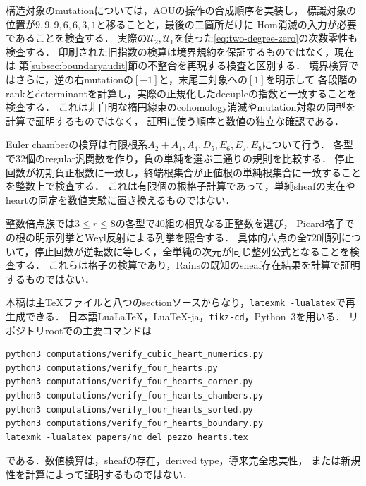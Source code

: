 構造対象のmutationについては，AOUの操作の合成順序を実装し，
標識対象の位置が$9,9,9,6,6,3,1$と移ることと，最後の二箇所だけに
Hom消滅の入力が必要であることを検査する．
実際の$\mathcal U_2,\mathcal U_1$を使った\eqref{eq:two-degree-zero}の次数零性も検査する．
印刷された旧指数の検算は境界規約を保証するものではなく，現在は
第\ref{subsec:boundaryaudit}節の不整合を再現する検査と区別する．
境界検算ではさらに，逆の右mutationの$[-1]$と，末尾三対象への$[1]$を明示して
各段階のrankとdeterminantを計算し，実際の正規化したdecupleの指数と一致することを検査する．
これは非自明な楕円線束のcohomology消滅やmutation対象の同型を計算で証明するものではなく，
証明に使う順序と数値の独立な確認である．

Euler chamberの検算は有限根系$A_2+A_1,A_4,D_5,E_6,E_7,E_8$について行う．
各型で32個のregular汎関数を作り，負の単純を選ぶ三通りの規則を比較する．
停止回数が初期負正根数に一致し，終端根集合が正値根の単純根集合に一致することを整数上で検査する．
これは有限個の根格子計算であって，単純sheafの実在やheartの同定を数値実験に置き換えるものではない．

整数倍点族では$3\le r\le8$の各型で40組の相異なる正整数を選び，
Picard格子での根の明示列挙とWeyl反射による列挙を照合する．
具体的六点の全720順列について，停止回数が逆転数に等しく，全単純の次元が同じ整列公式となることを検査する．
これらは格子の検算であり，Rainsの既知のsheaf存在結果を計算で証明するものではない．

本稿は主TeXファイルと八つのsectionソースからなり，\texttt{latexmk -lualatex}で再生成できる．
日本語LuaLaTeX，LuaTeX-ja，\texttt{tikz-cd}，Python~3を用いる．
リポジトリrootでの主要コマンドは
\begin{verbatim}
python3 computations/verify_cubic_heart_numerics.py
python3 computations/verify_four_hearts.py
python3 computations/verify_four_hearts_corner.py
python3 computations/verify_four_hearts_chambers.py
python3 computations/verify_four_hearts_sorted.py
python3 computations/verify_four_hearts_boundary.py
latexmk -lualatex papers/nc_del_pezzo_hearts.tex
\end{verbatim}
である．数値検算は，sheafの存在，derived type，導来完全忠実性，
または新規性を計算によって証明するものではない．


